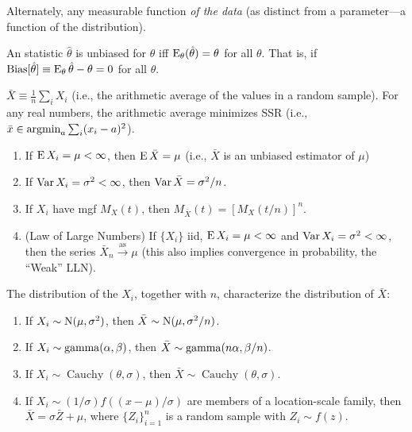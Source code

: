 \documentclass[8pt,letterpaper, landscape]{extarticle} %
\begin{document}
\begin{multicols}{3}
\begin{description}
Alternately, any measurable function \textit{of the data} (as distinct from a parameter---a function of the distribution).

 An statistic $ \hat{\theta} $ is unbiased for $ \theta $ iff $ \operatorname{E}_{\theta} (\hat{\theta}) = \theta $ for all $ \theta $. That is, if $ \operatorname{Bias} [\hat{\theta}] \equiv \operatorname{E}_{\theta} \hat{\theta} - \theta = 0 $ for all $ \theta $.

 $ \bar{X} \equiv \tfrac{1}{n} \sum_i X_i $ (i.e., the arithmetic average of the values in a random sample). For any real numbers, the arithmetic average minimizes SSR (i.e., $ \bar{x} \in \operatorname*{argmin}_a \sum_i (x_i - a)^2 $).
\begin{enumerate}
\item If $ \operatorname{E} X_i = \mu < \infty $, then $ \operatorname{E} \bar{X} = \mu $ (i.e., $ \bar{X} $ is an unbiased estimator of $ \mu $)
\item If $ \operatorname{Var} X_i = \sigma^2 < \infty $, then $ \operatorname{Var} \bar{X} = \sigma^2 / n $.
\item If $ X_i $ have mgf $ M_X(t) $, then $ M_{\bar{X}}(t) = [M_X(t/n)]^n $.
\item (Law of Large Numbers) If $ \{ X_i \} $ iid, $ \operatorname{E} X_i = \mu < \infty $ and $ \operatorname{Var} X_i = \sigma^2 < \infty $, then the series $ \bar{X}_n \xrightarrow{\text{as}} \mu $ (this also implies convergence in probability, the ``Weak'' LLN).
\end{enumerate}
The distribution of the $ X_i $, together with $ n $, characterize the distribution of $ \bar{X} $:
\begin{enumerate}
\item If $ X_i \sim \operatorname{N}(\mu, \sigma^2) $, then $ \bar{X} \sim \operatorname{N} (\mu, \sigma^2/n) $.
\item If $ X_i \sim \operatorname{gamma} (\alpha, \beta) $, then $ \bar{X} \sim \operatorname{gamma} (n \alpha, \beta / n) $.
\item If $ X_i \sim \operatorname{Cauchy} (\theta, \sigma) $, then $ \bar{X} \sim \operatorname{Cauchy} (\theta, \sigma) $.
\item If $ X_i \sim (1/ \sigma) f((x - \mu)/ \sigma) $ are members of a location-scale family, then $ \bar{X} = \sigma \bar{Z} + \mu $, where $ \{ Z_i \}_{i=1}^{n} $ is a random sample with $ Z_i \sim f(z) $.
\end{enumerate}


\end{description}
\end{multicols}
\end{document}
